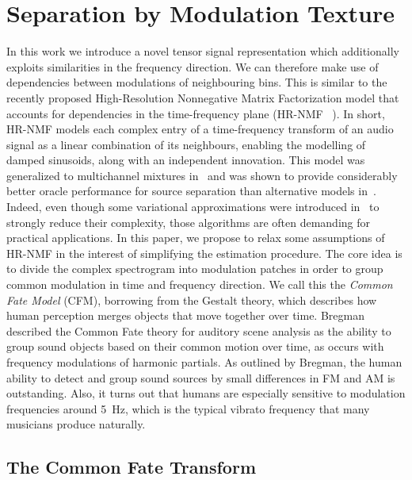\section{Separation by Modulation Texture}

In this work we introduce a novel tensor signal representation which additionally exploits similarities in the frequency direction. We can therefore make use of dependencies between modulations of neighbouring bins. This is similar to the recently proposed High-Resolution Nonnegative Matrix Factorization
model that accounts for dependencies in the time-frequency plane (HR-NMF
~\cite{badeau11}). In short, HR-NMF models each complex entry of a time-frequency transform of an audio signal as a linear combination of its neighbours, enabling the modelling of damped sinusoids, along with an independent
innovation. This model was generalized to multichannel mixtures in~\cite{badeau13a,badeau14}
and was shown to provide considerably better oracle performance for source separation than alternative models in~\cite{magron15a}.
Indeed, even though some variational approximations were introduced
in~\cite{badeau13} to strongly reduce their complexity,
those algorithms are often demanding for practical applications.
In this paper, we propose to relax some assumptions of HR-NMF in the interest of simplifying the estimation procedure. The core idea is to divide the complex spectrogram into modulation patches in order to group common modulation in time and frequency direction. We call this the \emph{Common Fate Model} (CFM), borrowing from the Gestalt theory, which describes how human perception merges objects that move together over time. Bregman~\cite{bregman94} described the Common Fate theory for auditory scene analysis as the ability to group sound objects based on their common motion over time, as occurs with frequency modulations of harmonic partials. As outlined by Bregman, the human ability to detect and group sound sources by small differences in FM and AM is outstanding. Also, it turns out that humans are especially sensitive to modulation frequencies around 5~Hz, which is the typical vibrato frequency that many musicians produce naturally.

\subsection{The Common Fate Transform}
\label{sub:CFT}

